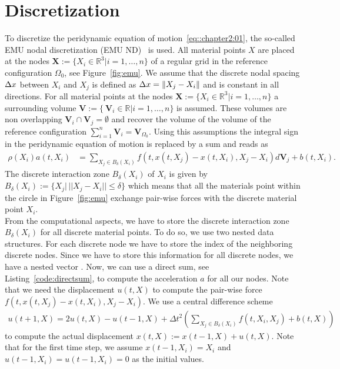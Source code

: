 \section{Discretization}
To discretize the peridynamic equation of motion~\eqref{eq::chapter2:01}, the so-called EMU nodal discretization (EMU ND)~\cite{parks2008implementing} is used. All material points $X$ are placed at the nodes $\mathbf{X}:=\lbrace X_i \in \mathbb{R}^3\vert i=1,\ldots,n\rbrace$ of a regular grid in the reference configuration $\Omega_0$, see Figure~\ref{fig:emu}. We assume that the  discrete nodal spacing ${\Delta x}$ between $X_i$ and $X_j$ is defined as ${\Delta x} = \Vert X_j - X_i \Vert$ and is constant in all directions. For all material points at the nodes $\mathbf{X}:=\lbrace X_i \in \mathbb{R}^3\vert i=1,\ldots,n\rbrace$ a surrounding volume $\mathbf{V}:=\lbrace\ \mathbf{V}_i \in \mathbb{R}\vert i=1,\ldots,n\rbrace$ is assumed. These volumes are non overlapping $\mathbf{V}_i \cap \mathbf{V}_j = \emptyset$ and recover the volume of the volume of the reference configuration $\sum_{i=1}^n \mathbf{V}_i = \mathbf{V}_{\Omega_0}$. Using this assumptions the integral sign in the peridynamic equation of motion is replaced by a sum and reads as
\begin{align}
\rho(X_i)a(t,X_i)&=\sum\limits_{X_j\in B_\delta(X_i)}  f\left(t,x(t,X_j)-x(t,X_i), X_j-X_i\right)d\mathbf{V}_j + b(t,X_i) \text{.}
\label{eq:discrete:pd}
\end{align}
The discrete interaction zone $B_\delta(X_i)$ of $X_i$ is given by $B_\delta(X_i):=\lbrace X_j \vert \,\vert\vert X_j-X_i\vert\vert \leq \delta\rbrace$ which means that all the materials point within the circle in Figure~\ref{fig:emu} exchange pair-wise forces with the discrete material point $X_i$.\\

From the computational aspects, we have to store the discrete interaction zone $B_\delta(X_i)$ for all discrete material points. To do so, we use two nested  data structures. For each discrete node we have  to store the index of the neighboring discrete nodes. Since we have to store this information for all discrete nodes, we have a nested vector . Now, we can use a direct sum, see Listing~\ref{code:directsum}, to compute the acceleration $a$ for all our nodes. Note that we need the displacement 
$u(t,X)$ to compute the pair-wise force $f\left(t,x(t,X_j)-x(t,X_i), X_j-X_i\right)$. We use a central difference scheme 
\begin{align}
u(t+1,X) =  2 u(t,X) - u(t-1,X) + \Delta t^2 \left(\sum\limits_{X_j\in B_\delta(X_i)} f(t,X_i,X_j)+b(t,X)\right)
\label{eq:pd:displacement}
\end{align}
to compute the actual displacement $x(t,X):= x(t-1,X) + u(t,X)$. Note that for the first time step, we assume $x(t-1,X_i)=X_i$ and $u(t-1,X_i)=u(t-1,X_i)=0$ as the initial values.

